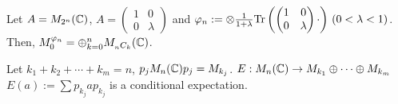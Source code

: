\begin{theorem}
  Let $A = M_{2^n}(\mathbb{C})$, $A = \begin{pmatrix} 1 & 0 \\ 0 & \lambda \end{pmatrix}$ and $\varphi_n : = \otimes \frac{1}{1+\lambda}{\rm Tr}\left(\begin{pmatrix} 1 & 0 \\ 0 & \lambda \end{pmatrix} \cdot \right) \, (0 < \lambda < 1)$. Then, $M_0^{\varphi_n} = \oplus_{k=0}^n M_{_nC_k}(\mathbb{C})$.
\end{theorem}

\begin{proposition}
  Let $k_1 +k_2 + \cdots +k_m=n$, $p_{j}M_n(\mathbb{C})p_{j}=M_{k_j}$.
  $E:M_n(\mathbb{C}) \rightarrow M_{k_1}\oplus \cdots \oplus M_{k_m}$ $E(a):= \sum p_{k_j}ap_{k_j}$ is a conditional expectation.
\end{proposition}
